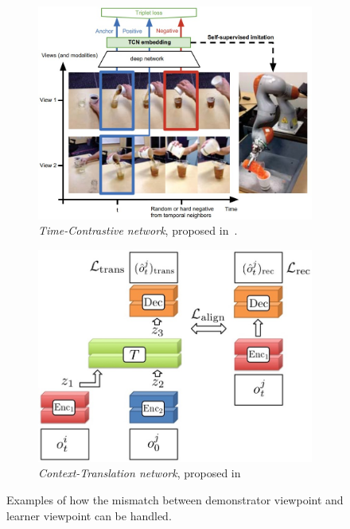 \begin{figure}[t]
    \centering
    \begin{subfigure}[b]{0.50\textwidth}
        \centering
        \includegraphics[width=\textwidth]{figures/images/view_point_mismatch/time-contrastive-network.jpg}
        \caption{\textit{Time-Contrastive network}, proposed in~\cite{sermanet2018time_contrastive}.}
        \label{fig:time_contrastive}
    \end{subfigure}
    \hfill
    \begin{subfigure}[b]{0.45\textwidth}
        \includegraphics[width=\textwidth]{figures/images/view_point_mismatch/context-translation-model.jpg}
        \caption{\textit{Context-Translation network}, proposed in~\cite{liu2018imitation_from_observation}}
        \label{fig:context-translation}
    \end{subfigure}
    \caption{Examples of how the mismatch between demonstrator viewpoint and learner viewpoint can be handled.}
    \label{fig:differet_viewpoint}
\end{figure}
